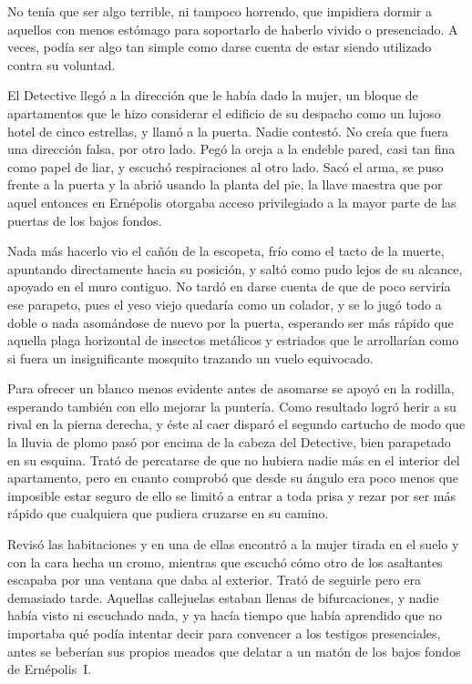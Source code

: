 No tenía que ser algo terrible, ni tampoco horrendo, que impidiera dormir a aquellos con menos estómago para soportarlo de haberlo vivido o presenciado. A veces, podía ser algo tan simple como darse cuenta de estar siendo utilizado contra su voluntad.

El Detective llegó a la dirección que le había dado la mujer, un bloque de apartamentos que le hizo considerar el edificio de su despacho como un lujoso hotel de cinco estrellas, y llamó a la puerta. Nadie contestó. No creía que fuera una dirección falsa, por otro lado. Pegó la oreja a la endeble pared, casi tan fina como papel de liar, y escuchó respiraciones al otro lado. Sacó el arma, se puso frente a la puerta y la abrió usando la planta del pie, la llave maestra que por aquel entonces en Ernépolis otorgaba acceso privilegiado a la mayor parte de las puertas de los bajos fondos.

Nada más hacerlo vio el cañón de la escopeta, frío como el tacto de la muerte, apuntando directamente hacia su posición, y saltó como pudo lejos de su alcance, apoyado en el muro contiguo. No tardó en darse cuenta de que de poco serviría ese parapeto, pues el yeso viejo quedaría como un colador, y se lo jugó todo a doble o nada asomándose de nuevo por la puerta, esperando ser más rápido que aquella plaga horizontal de insectos metálicos y estriados que le arrollarían como si fuera un insignificante mosquito trazando un vuelo equivocado.

Para ofrecer un blanco menos evidente antes de asomarse se apoyó en la rodilla, esperando también con ello mejorar la puntería. Como resultado logró herir a su rival en la pierna derecha, y éste al caer disparó el segundo cartucho de modo que la lluvia de plomo pasó por encima de la cabeza del Detective, bien parapetado en su esquina. Trató de percatarse de que no hubiera nadie más en el interior del apartamento, pero en cuanto comprobó que desde su ángulo era poco menos que imposible estar seguro de ello se limitó a entrar a toda prisa y rezar por ser más rápido que cualquiera que pudiera cruzarse en su camino.

Revisó las habitaciones y en una de ellas encontró a la mujer tirada en el suelo y con la cara hecha un cromo, mientras que escuchó cómo otro de los asaltantes escapaba por una ventana que daba al exterior. Trató de seguirle pero era demasiado tarde. Aquellas callejuelas estaban llenas de bifurcaciones, y nadie había visto ni escuchado nada, y ya hacía tiempo que había aprendido que no importaba qué podía intentar decir para convencer a los testigos presenciales, antes se beberían sus propios meados que delatar a un matón de los bajos fondos de Ernépolis~I.

